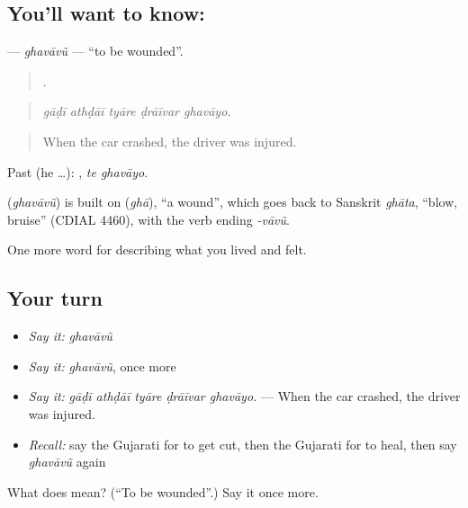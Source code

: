 \subsection*{You'll want to know: }
\textbf{} — \emph{ghavāvũ} — \textquotedblleft{}to be wounded\textquotedblright{}.

\begin{quote}
    .
\end{quote}

\begin{quote}
\emph{gāḍī athḍāī tyāre ḍrāīvar ghavāyo.}
\end{quote}

\begin{quote}
When the car crashed, the driver was injured.
\end{quote}

Past (he …):  , \emph{te ghavāyo}.

\begin{cousinweb}
\textbf{} (\emph{ghavāvũ}) is built on \textbf{} (\emph{ghā}), \textquotedblleft{}a wound\textquotedblright{}, which goes back to Sanskrit \emph{ghāta}, \textquotedblleft{}blow, bruise\textquotedblright{} (CDIAL 4460), with the verb ending \emph{-vāvũ}.
\end{cousinweb}

\begin{grammarlens}[title={What you've built}]
One more word for describing what you lived and felt.
\end{grammarlens}

\subsection*{Your turn}
\begin{itemize}
\raggedright
  \item \emph{Say it:} \emph{ghavāvũ}
  \item \emph{Say it:} \emph{ghavāvũ}, once more
  \item \emph{Say it:} \emph{gāḍī athḍāī tyāre ḍrāīvar ghavāyo.} — When the car crashed, the driver was injured.
  \item \emph{Recall:} say the Gujarati for to get cut, then the Gujarati for to heal, then say \emph{ghavāvũ} again
\end{itemize}

\begin{tcolorbox}[breakable,colback=teal!4,colframe=teal!35!black,title={Before you move on}]
What does  mean? (\textquotedblleft{}To be wounded\textquotedblright{}.) Say it once more.
\end{tcolorbox}
